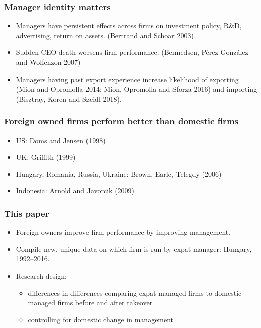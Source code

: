 \documentclass[aspectratio=43,compress,mathserif]{beamer}
\begin{document}
\begin{frame}\frametitle{Manager identity matters}\hypertarget{Manager identity matters}{}
\begin{itemize}
\item Managers have persistent effects across firms on investment policy, R\&D, advertising, return on assets.  (Bertrand and Schoar 2003)

\item Sudden CEO death worsens firm performance. (Bennedsen, Pérez-González and Wolfenzon 2007) 

\item Managers having past export experience increase likelihood of exporting (Mion and Opromolla 2014; Mion, Opromolla and Sforza 2016) and importing (Bisztray, Koren and Szeidl 2018).


\end{itemize}
\end{frame}



\begin{frame}\frametitle{Foreign owned firms perform better than domestic firms}\hypertarget{Foreign owned firms perform better than domestic firms}{}
\begin{itemize}
\item US: Doms and Jensen (1998)

\item UK: Griffith (1999)

\item Hungary, Romania, Russia, Ukraine: Brown, Earle, Telegdy (2006)

\item Indonesia: Arnold and Javorcik (2009)




\end{itemize}
\end{frame}



\begin{frame}\frametitle{This paper}\hypertarget{This paper}{}
\begin{itemize}
\item Foreign owners improve firm performance by improving management.

\item Compile new, unique data on which firm is run by expat manager: Hungary, 1992--2016. 

\item Research design: 
\begin{itemize}
\item differences-in-differences comparing expat-managed firms to domestic managed firms before and after takeover

\item controlling for domestic change in management


\end{itemize}

\end{itemize}
\end{frame}
\end{document}
